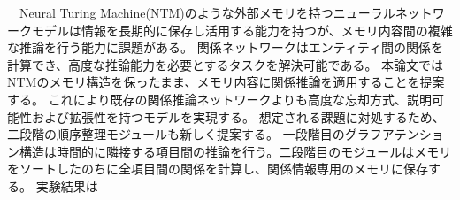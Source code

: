 \abstract
　Neural Turing Machine(NTM)のような外部メモリを持つニューラルネットワークモデルは情報を長期的に保存し活用する能力を持つが、メモリ内容間の複雑な推論を行う能力に課題がある。
関係ネットワークはエンティティ間の関係を計算でき、高度な推論能力を必要とするタスクを解決可能である。
本論文ではNTMのメモリ構造を保ったまま、メモリ内容に関係推論を適用することを提案する。
これにより既存の関係推論ネットワークよりも高度な忘却方式、説明可能性および拡張性を持つモデルを実現する。 想定される課題に対処するため、二段階の順序整理モジュールも新しく提案する。
一段階目のグラフアテンション構造は時間的に隣接する項目間の推論を行う。二段階目のモジュールはメモリをソートしたのちに全項目間の関係を計算し、関係情報専用のメモリに保存する。
実験結果は
